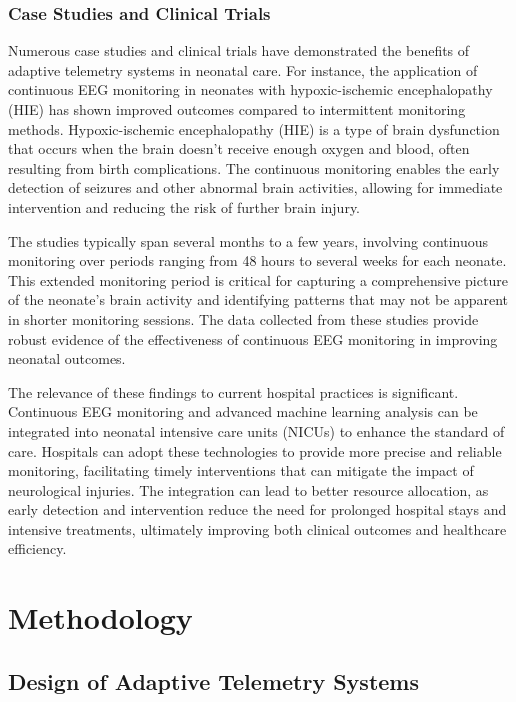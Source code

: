 \documentclass[12pt,journal,compsoc]{IEEEtran}
\begin{document}
\subsubsection{Case Studies and Clinical Trials}

Numerous case studies and clinical trials have demonstrated the benefits of adaptive telemetry systems in neonatal care. For instance, the application of continuous EEG monitoring in neonates with hypoxic-ischemic encephalopathy (HIE) has shown improved outcomes compared to intermittent monitoring methods. Hypoxic-ischemic encephalopathy (HIE) is a type of brain dysfunction that occurs when the brain doesn't receive enough oxygen and blood, often resulting from birth complications. The continuous monitoring enables the early detection of seizures and other abnormal brain activities, allowing for immediate intervention and reducing the risk of further brain injury.

The studies typically span several months to a few years, involving continuous monitoring over periods ranging from 48 hours to several weeks for each neonate. This extended monitoring period is critical for capturing a comprehensive picture of the neonate's brain activity and identifying patterns that may not be apparent in shorter monitoring sessions. The data collected from these studies provide robust evidence of the effectiveness of continuous EEG monitoring in improving neonatal outcomes.

The relevance of these findings to current hospital practices is significant. Continuous EEG monitoring and advanced machine learning analysis can be integrated into neonatal intensive care units (NICUs) to enhance the standard of care. Hospitals can adopt these technologies to provide more precise and reliable monitoring, facilitating timely interventions that can mitigate the impact of neurological injuries. The integration can lead to better resource allocation, as early detection and intervention reduce the need for prolonged hospital stays and intensive treatments, ultimately improving both clinical outcomes and healthcare efficiency.

\section{Methodology}

\subsection{Design of Adaptive Telemetry Systems}
\end{document}
